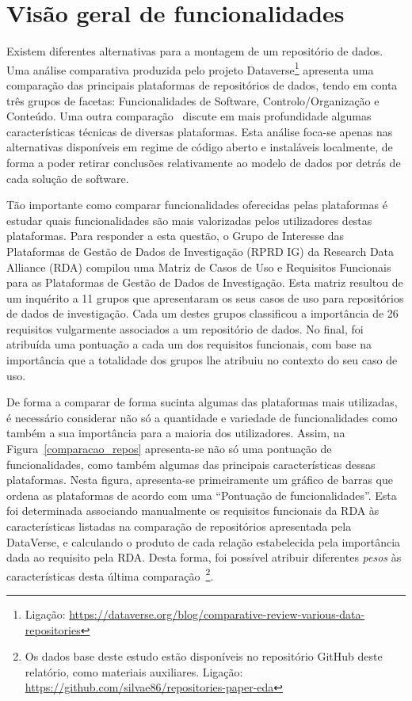 \documentclass[sigconf,nonacm]{acmart}
\begin{document}
\section{Visão geral de funcionalidades}

Existem diferentes alternativas para a montagem de um repositório de dados. Uma análise comparativa produzida pelo projeto Dataverse\footnote{Ligação:  \url{https://dataverse.org/blog/comparative-review-various-data-repositories}} apresenta uma comparação das principais plataformas de repositórios de dados, tendo em conta três grupos de facetas: Funcionalidades de Software, Controlo/Organização e Conteúdo. Uma outra comparação~\cite{amorimComparison2017} discute em mais profundidade algumas características técnicas de diversas plataformas. Esta análise foca-se apenas nas alternativas disponíveis em regime de código aberto e instaláveis localmente, de forma a poder retirar conclusões relativamente ao modelo de dados por detrás de cada solução de software. 

Tão importante como comparar funcionalidades oferecidas pelas plataformas é estudar quais funcionalidades são mais valorizadas pelos utilizadores destas plataformas. Para responder a esta questão, o Grupo de Interesse das Plataformas de Gestão de Dados de Investigação (RPRD IG) da Research Data Alliance (RDA) compilou uma Matriz de Casos de Uso e Requisitos Funcionais para as Plataformas de Gestão de Dados de Investigação. Esta matriz resultou de um inquérito a 11 grupos que apresentaram os seus casos de uso para repositórios de dados de investigação. Cada um destes grupos classificou a importância de 26 requisitos vulgarmente associados a um repositório de dados. No final, foi atribuída uma pontuação a cada um dos requisitos funcionais, com base na importância que a totalidade dos grupos lhe atribuiu no contexto do seu caso de uso.

De forma a comparar de forma sucinta algumas das plataformas mais utilizadas, é necessário considerar não só a quantidade e variedade de funcionalidades como também a sua importância para a maioria dos utilizadores. Assim, na Figura~\ref{comparacao_repos} apresenta-se não só uma pontuação de funcionalidades, como também algumas das principais características dessas plataformas. Nesta figura, apresenta-se primeiramente um gráfico de barras que ordena as plataformas de acordo com uma ``Pontuação de funcionalidades''. Esta foi determinada associando manualmente os requisitos funcionais da RDA às características listadas na comparação de repositórios apresentada pela DataVerse, e calculando o produto de cada relação estabelecida pela importância dada ao requisito pela RDA. Desta forma, foi possível atribuir diferentes \emph{pesos} às características desta última comparação~\footnote{Os dados base deste estudo estão disponíveis no repositório GitHub deste relatório, como materiais auxiliares. Ligação: \url{https://github.com/silvae86/repositories-paper-eda}}. 
\end{document}
